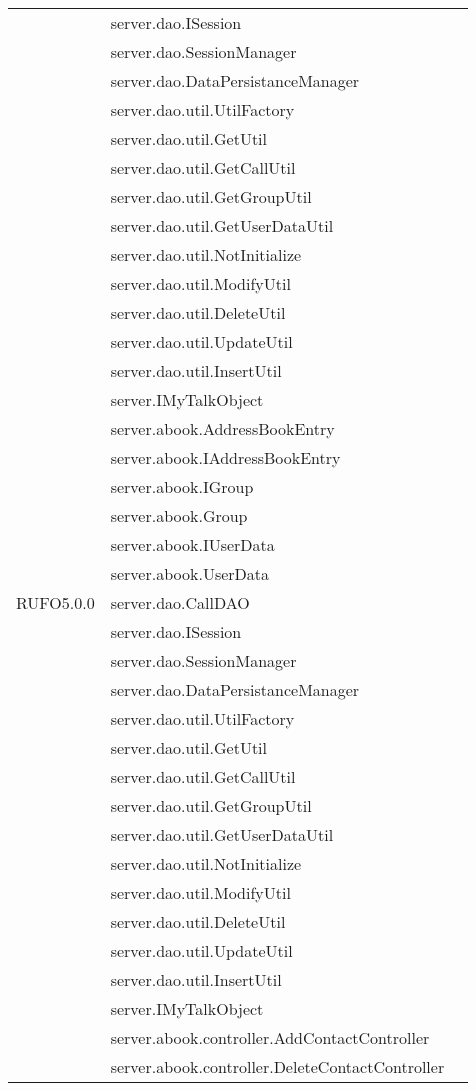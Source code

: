 \begin{center}
\begin{longtable}{lp{}l}
& server.dao.ISession\\
& server.dao.SessionManager\\
& server.dao.DataPersistanceManager\\
& server.dao.util.UtilFactory\\
& server.dao.util.GetUtil\\
& server.dao.util.GetCallUtil\\
& server.dao.util.GetGroupUtil\\
& server.dao.util.GetUserDataUtil\\
& server.dao.util.NotInitialize\\
& server.dao.util.ModifyUtil\\
& server.dao.util.DeleteUtil\\
& server.dao.util.UpdateUtil\\
& server.dao.util.InsertUtil\\
& server.IMyTalkObject\\
& server.abook.AddressBookEntry\\
& server.abook.IAddressBookEntry\\
& server.abook.IGroup\\
& server.abook.Group\\
& server.abook.IUserData\\
& server.abook.UserData\\
RUFO5.0.0 & server.dao.CallDAO\\
& server.dao.ISession\\
& server.dao.SessionManager\\
& server.dao.DataPersistanceManager\\
& server.dao.util.UtilFactory\\
& server.dao.util.GetUtil\\
& server.dao.util.GetCallUtil\\
& server.dao.util.GetGroupUtil\\
& server.dao.util.GetUserDataUtil\\
& server.dao.util.NotInitialize\\
& server.dao.util.ModifyUtil\\
& server.dao.util.DeleteUtil\\
& server.dao.util.UpdateUtil\\
& server.dao.util.InsertUtil\\
& server.IMyTalkObject\\
& server.abook.controller.AddContactController\\
& server.abook.controller.DeleteContactController\\

\end{longtable}
\end{center}
